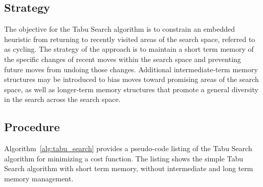 \subsection{Strategy}
The objective for the Tabu Search algorithm is to constrain an embedded heuristic from returning to recently visited areas of the search space, referred to as cycling. 
The strategy of the approach is to maintain a short term memory of the specific changes of recent moves within the search space and preventing future moves from undoing those changes. Additional intermediate-term memory structures may be introduced to bias moves toward promising areas of the search space, as well as longer-term memory structures that promote a general diversity in the search across the search space.

\subsection{Procedure}
Algorithm~\ref{alg:tabu_search} provides a pseudo-code listing of the Tabu Search algorithm for minimizing a cost function. The listing shows the simple Tabu Search algorithm with short term memory, without intermediate and long term memory management. 

